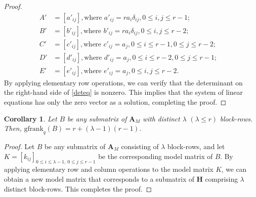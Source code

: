 \documentclass[conference]{IEEEtran}
\newtheorem{corollary}{Corollary}
\begin{document}
\begin{proof}
\begin{align*}
         A'&=[a'_{ij}], \text{where } a'_{ij}=ra_{i}\delta_{ij}, 0\leq i,j\leq r-1;\\
          B'&=[b'_{ij}], \text{where } b'_{ij}=ra_{i}\delta_{ij},0\leq i,j\leq r-2;\\
           C'&=[c'_{ij}], \text{where } c'_{ij}=a_{j},0\leq i\leq r-1,0\leq j\leq r-2;\\
             D'&=[d'_{ij}], \text{where } d'_{ij}=a_{j}, 0\leq i\leq r-2,0\leq j\leq r-1;\\
                E'&=[e'_{ij}], \text{where } e'_{ij}=a_{j},  0\leq i,j\leq r-2.
    \end{align*}
By applying elementary row operations, we can verify that the determinant on the right-hand side of \eqref{deteq} is nonzero. This implies that the system of linear equations has only the zero vector as a solution, completing the proof.\end{proof}
\begin{corollary}\label{cor1}
	Let $B$ be any submatrix of $\mathbf{A}_{M}$ 
with distinct $\lambda$ $(\lambda\leq r)$ block-rows. Then, $\mathrm{gfrank}_{q}(B)=r+(\lambda-1)(r-1)$.
\end{corollary}
\begin{proof} Let $B$ be any submatrix of $\mathbf{A}_{M}$ consisting of $\lambda$ block-rows, and let
$K = [k_{ij}]_{0 \leq i \leq \lambda - 1,\ 0 \leq j \leq r - 1}$
be the corresponding model matrix of $B$. By applying elementary row and column operations to the model matrix $K$, we can obtain a new model matrix that corresponds to a submatrix of $\mathbf{H}$ comprising $\lambda$ distinct block-rows. This completes the proof.\end{proof}
\end{document}
